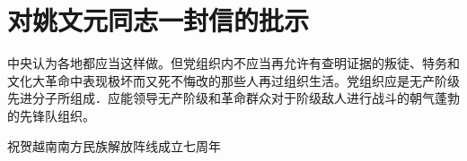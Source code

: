 \section[对姚文元同志一封信的批示（一九六七年十二月）]{对姚文元同志一封信的批示}


中央认为各地都应当这样做。但党组织内不应当再允许有查明证据的叛徒、特务和文化大革命中表现极坏而又死不悔改的那些人再过组织生活。党组织应是无产阶级先进分子所组成．应能领导无产阶级和革命群众对于阶级敌人进行战斗的朝气蓬勃的先锋队组织。

祝贺越南南方民族解放阵线成立七周年

